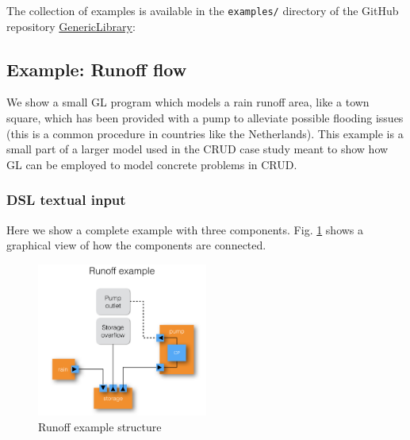 The collection of examples is available in the \verb+examples/+ directory of the GitHub repository \href{https://github.com/GRACeFUL-project/GenericLibrary}{GenericLibrary}:


\subsection{Example: Runoff flow}
\label{example-runoff-flow}

We show a small GL program which models a rain runoff area, like a
town square, which has been provided with a pump to alleviate possible
flooding issues (this is a common procedure in countries like the
Netherlands).
%
This example is a small part of a larger model used in the CRUD case
study meant to show how GL can be employed to model concrete problems
in CRUD.


\subsubsection{DSL textual input}
\label{example-runoff-flow-dsl-textual-input}

Here we show a complete example with three components.
%
Fig. \ref{fig:RunoffEx} shows a graphical view of how the components
are connected.
%
\begin{figure}[htbp]
  \centering
\includegraphics[width=0.5\textwidth]{fig/RunoffExample.jpg}
  \caption{Runoff example structure}
  \label{fig:RunoffEx}
\end{figure}

